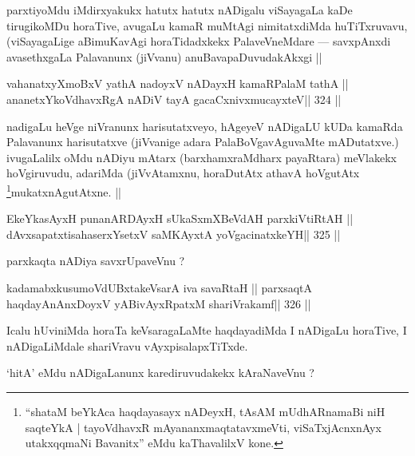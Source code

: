 \begin{artha}
parxtiyoMdu iMdirxyakukx hatutx hatutx nADigalu viSayagaLa kaDe tirugikoMDu horaTive, avugaLu kamaR muMtAgi nimitatxdiMda huTiTxruvavu, (viSayagaLige aBimuKavAgi horaTidadxkekx PalaveVneMdare --- savxpAnxdi avasethxgaLa Palavanunx (jiVvanu) anuBavapaDuvudakAkxgi ||
\end{artha}

\begin{shl}
vahanatxyXmoBxV yathA nadoyxV nADayxH kamaRPalaM tathA ||
ananetxYkoVdhavxRgA nADiV tayA gacaCxnivxmucayxteV\hfill || 324 ||
\end{shl}

\begin{artha}
nadigaLu heVge niVranunx harisutatxveyo, hAgeyeV nADigaLU kUDa kamaRda Palavanunx harisutatxve (jiVvanige adara PalaBoVgavAguvaMte mADutatxve.) ivugaLalilx oMdu nADiyu mAtarx (barxhamxraMdharx payaRtara) meVlakekx hoVgiruvudu, adariMda (jiVvAtamxnu, horaDutAtx athavA hoVgutAtx \footnote[5]{``shataM beYkAca haqdayasayx nADeyxH, tAsAM mUdhARnamaBi niH saqteYkA | tayoVdhavxR mAyananxmaqtatavxmeVti, viSaTxjAcnxnAyx utakxqqmaNi Bavanitx'' eMdu kaThavalilxV kone.}mukatxnAgutAtxne. ||
\end{artha}

\begin{shl}
EkeYkasAyxH punanARDAyxH sUkaSxmXBeVdAH parxkiVtiRtAH ||
dAvxsapatxtisahaserxYsetxV saMKAyxtA yoVgacinatxkeYH\hfill || 325 ||
\end{shl}


\begin{artha}
parxkaqta nADiya savxrUpaveVnu ?
\end{artha}

\begin{shl}
kadamabxkusumoVdUBxtakeVsarA iva savaRtaH ||
parxsaqtA haqdayAnAnxDoyxV yABivAyxRpatxM shariVrakamf\hfill || 326 ||
\end{shl}

\begin{artha}
Icalu hUviniMda horaTa keVsaragaLaMte haqdayadiMda I nADigaLu horaTive, I nADigaLiMdale shariVravu vAyxpisalapxTiTxde.
\end{artha}

\begin{artha}
`hitA' eMdu nADigaLanunx karediruvudakekx kAraNaveVnu ?
\end{artha}

